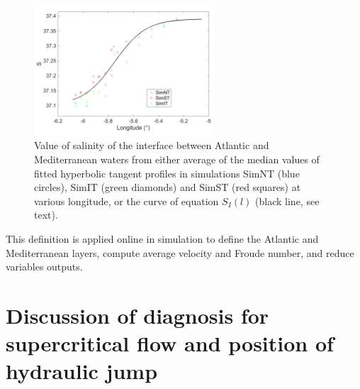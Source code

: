 \begin{figure}[!h]
 \centering
 \includegraphics[width=0.6\textwidth]{./GBR3D/salinite_interface_papier.png}
 \caption [Value of salinity of the interface between Atlantic and Mediterranean waters]{Value of salinity of the interface between Atlantic and Mediterranean waters from either average of the median values of fitted hyperbolic tangent profiles in simulations SimNT (blue circles), SimIT (green diamonds) and SimST (red squares) at various longitude, or the curve of equation $S_I(l)$ (black line, see text).}
 \label{fig_defintf}
\end{figure}

This definition is applied online in simulation to define the Atlantic and Mediterranean layers, compute average velocity and Froude number, and reduce variables outputs.

\color{red}
\section{Discussion of diagnosis for supercritical flow and position of hydraulic jump}
\label{appendix_compdiag}


